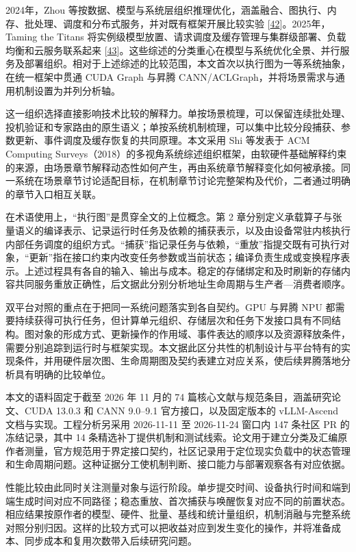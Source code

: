 \documentclass[UTF8,10.5pt,fontset=windows]{ctexart}
\begin{document}
2024年，Zhou
等按数据、模型与系统层组织推理优化，涵盖融合、图执行、内存、批处理、调度和分布式服务，并对既有框架开展比较实验
{[}\protect\hyperlink{ref-zhou2024survey}{42}{]}。2025年，Taming the
Titans
将实例级模型放置、请求调度及缓存管理与集群级部署、负载均衡和云服务联系起来
{[}\protect\hyperlink{ref-zhen2025titans}{43}{]}。这些综述的分类重心在模型与系统优化全景、并行服务及部署组织。相对于上述综述的比较范围，本文首次以执行图为一等系统抽象，在统一框架中贯通
CUDA Graph 与昇腾
CANN/ACLGraph，并将场景需求与通用机制设置为并列分析轴。

这一组织选择直接影响技术比较的解释力。单按场景梳理，可以保留连续批处理、投机验证和专家路由的原生语义；单按系统机制梳理，可以集中比较分段捕获、参数更新、事件调度及缓存恢复的共同原理。本文采用
Shi 等发表于 ACM Computing
Surveys（2018）的多视角系统综述组织框架，由软硬件基础解释约束的来源，由场景章节解释动态性如何产生，再由系统章节解释变化如何被承接。同一系统在场景章节讨论适配目标，在机制章节讨论完整架构及代价，二者通过明确的章节入口相互关联。

在术语使用上，``执行图''是贯穿全文的上位概念。第 2
章分别定义承载算子与张量语义的编译表示、记录运行时任务及依赖的捕获表示，以及由设备常驻内核执行内部任务调度的组织方式。``捕获''指记录任务与依赖，``重放''指提交既有可执行对象，``更新''指在接口约束内改变任务参数或当前状态；编译负责生成或变换程序表示。上述过程具有各自的输入、输出与成本。稳定的存储绑定和及时刷新的存储内容共同服务重放正确性，后文据此分别分析地址生命周期与生产者---消费者顺序。

双平台对照的重点在于把同一系统问题落实到各自契约。GPU 与昇腾 NPU
都需要持续获得可执行任务，但计算单元组织、存储层次和任务下发接口具有不同结构。图对象的形成方式、更新操作的作用域、事件表达的顺序以及资源释放条件，需要分别追踪到运行时与框架实现。本文据此区分共性的机制设计与平台特有的实现条件，并用硬件层次图、生命周期图及契约表建立对应关系，使后续昇腾落地分析具有明确的比较单位。

本文的语料固定于截至 2026 年 11 月的 74
篇核心文献与规范条目，涵盖研究论文、CUDA 13.0.3 和 CANN 9.0--9.1
官方接口，以及固定版本的 vLLM-Ascend 文档与实现。工程分析另采用
2026-11-11 至 2026-11-24 窗口内 147 条社区 PR 的冻结记录，其中 14
条精选补丁提供机制和测试线索。论文用于建立分类及汇编原作者测量，官方规范用于界定接口契约，社区记录用于定位现实负载中的状态管理和生命周期问题。这种证据分工使机制判断、接口能力与部署观察各有对应依据。

性能比较由此同时关注测量对象与运行阶段。单步提交时间、设备执行时间和端到端生成时间对应不同路径；稳态重放、首次捕获与唤醒恢复对应不同的前置状态。相应结果按原作者的模型、硬件、批量、基线和统计量组织，机制消融与完整系统对照分别归因。这样的比较方式可以把收益对应到发生变化的操作，并将准备成本、同步成本和复用次数带入后续研究问题。
\end{document}
